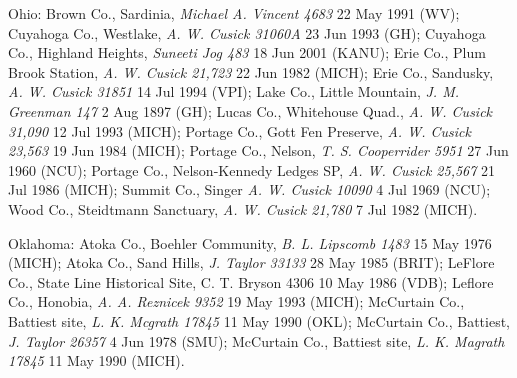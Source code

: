 \documentclass{article}
\begin{document}
Ohio:
Brown Co., Sardinia, \textit{Michael A. Vincent 4683} 22 May 1991 (WV);
Cuyahoga Co., Westlake, \textit{A. W. Cusick 31060A} 23 Jun 1993 (GH);
Cuyahoga Co., Highland Heights, \textit{Suneeti Jog 483} 18 Jun 2001 (KANU);
Erie Co., Plum Brook Station, \textit{A. W. Cusick 21,723} 22 Jun 1982 (MICH);
Erie Co., Sandusky, \textit{A. W. Cusick 31851} 14 Jul 1994 (VPI);
Lake Co., Little Mountain, \textit{J. M. Greenman 147} 2 Aug 1897 (GH);
Lucas Co., Whitehouse Quad., \textit{A. W. Cusick 31,090} 12 Jul 1993 (MICH);
Portage Co., Gott Fen Preserve, \textit{A. W. Cusick 23,563} 19 Jun 1984 (MICH);
Portage Co., Nelson, \textit{T. S. Cooperrider 5951} 27 Jun 1960 (NCU);
Portage Co., Nelson-Kennedy Ledges SP, \textit{A. W. Cusick 25,567} 21 Jul 1986 (MICH);
Summit Co., Singer \textit{A. W. Cusick 10090} 4 Jul 1969 (NCU);
Wood Co., Steidtmann Sanctuary, \textit{A. W. Cusick 21,780} 7 Jul 1982 (MICH).

Oklahoma:
Atoka Co., Boehler Community, \textit{B. L. Lipscomb 1483} 15 May 1976 (MICH);
Atoka Co., Sand Hills, \textit{J. Taylor 33133} 28 May 1985 (BRIT);
LeFlore Co., State Line Historical Site, C. T. Bryson 4306 10 May 1986 (VDB);
Leflore Co., Honobia, \textit{A. A. Reznicek 9352} 19 May 1993 (MICH);
McCurtain Co., Battiest site, \textit{L. K. Mcgrath 17845} 11 May 1990 (OKL);
McCurtain Co., Battiest, \textit{J. Taylor 26357} 4 Jun 1978 (SMU);
McCurtain Co., Battiest site, \textit{L. K. Magrath 17845} 11 May 1990 (MICH).
\end{document}
